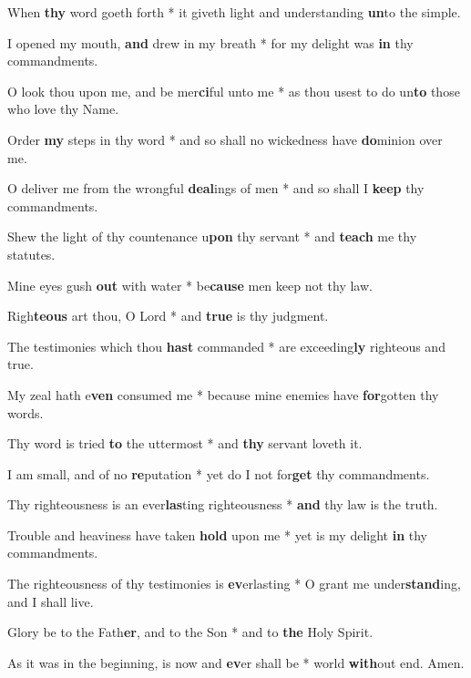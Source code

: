 \begin{multicols}{2}
	When \textbf{thy} word goeth forth * it giveth light and understanding \textbf{un}to the simple.
	
	I opened my mouth, \textbf{and} drew in my breath * for my delight was \textbf{in} thy commandments.
	
	O look thou upon me, and be mer\textbf{ci}ful unto me * as thou usest to do un\textbf{to} those who love thy Name.
	
	Order \textbf{my} steps in thy word * and so shall no wickedness have \textbf{do}minion over me.
	
	O deliver me from the wrongful \textbf{deal}ings of men * and so shall I \textbf{keep} thy commandments.
	
	Shew the light of thy countenance u\textbf{pon} thy servant * and \textbf{teach} me thy statutes.
	
	Mine eyes gush \textbf{out} with water * be\textbf{cause} men keep not thy law.
	
	Righ\textbf{teous} art thou, O Lord * and \textbf{true} is thy judgment.
	
	The testimonies which thou \textbf{hast} commanded * are exceeding\textbf{ly} righteous and true.
	
	My zeal hath e\textbf{ven} consumed me * because mine enemies have \textbf{for}gotten thy words.
	
	Thy word is tried \textbf{to} the uttermost * and \textbf{thy} servant loveth it.
	
	I am small, and of no \textbf{re}putation * yet do I not for\textbf{get} thy commandments.
	
	Thy righteousness is an ever\textbf{las}ting righteousness * \textbf{and} thy law is the truth.
	
	Trouble and heaviness have taken \textbf{hold} upon me * yet is my delight \textbf{in} thy commandments.
	
	The righteousness of thy testimonies is \textbf{ev}erlasting * O grant me under\textbf{stand}ing, and I shall live.
	
	Glory be to the Fath\textbf{er}, and to the Son * and to \textbf{the} Holy Spirit.
	
	As it was in the beginning, is now and \textbf{ev}er shall be * world \textbf{with}out end. Amen.
\end{multicols}